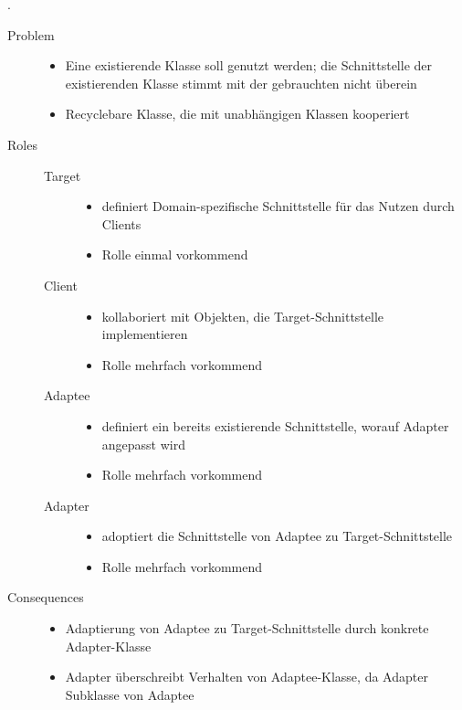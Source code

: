 .\begin{description}
    \item[Problem] \hfill
    \begin{itemize}
        \item Eine existierende Klasse soll genutzt werden; die Schnittstelle der existierenden Klasse stimmt mit der gebrauchten nicht überein
        \item Recyclebare Klasse, die mit unabhängigen Klassen kooperiert
    \end{itemize}
    \item[Roles] \hfill
    \begin{description}
        \item[Target] \hfill
        \begin{itemize}
            \item definiert Domain-spezifische Schnittstelle für das Nutzen durch Clients
            \item Rolle einmal vorkommend
        \end{itemize}
        \item[Client] \hfill 
        \begin{itemize}
            \item kollaboriert mit Objekten, die Target-Schnittstelle implementieren
            \item Rolle mehrfach vorkommend
        \end{itemize}
        \item[Adaptee] \hfill 
        \begin{itemize}
            \item definiert ein bereits existierende Schnittstelle, worauf Adapter angepasst wird
            \item Rolle mehrfach vorkommend
        \end{itemize}
        \item[Adapter] \hfill 
        \begin{itemize}
            \item adoptiert die Schnittstelle von Adaptee zu Target-Schnittstelle
            \item Rolle mehrfach vorkommend
        \end{itemize}
    \end{description}
    \item[Consequences] \hfill 
        \begin{itemize}
            \item Adaptierung von Adaptee zu Target-Schnittstelle durch konkrete Adapter-Klasse
            \item Adapter überschreibt Verhalten von Adaptee-Klasse, da Adapter Subklasse von Adaptee 
        \end{itemize}
\end{description}

